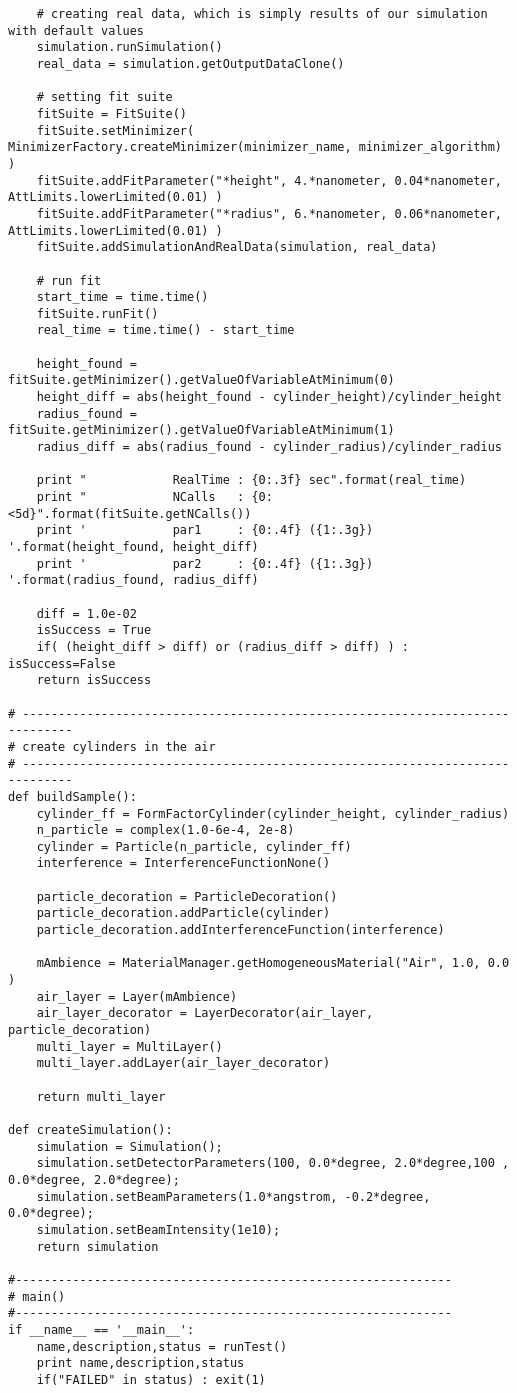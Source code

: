 \begin{lstlisting}
    # creating real data, which is simply results of our simulation with default values
    simulation.runSimulation()
    real_data = simulation.getOutputDataClone()

    # setting fit suite
    fitSuite = FitSuite()
    fitSuite.setMinimizer( MinimizerFactory.createMinimizer(minimizer_name, minimizer_algorithm) )
    fitSuite.addFitParameter("*height", 4.*nanometer, 0.04*nanometer, AttLimits.lowerLimited(0.01) )
    fitSuite.addFitParameter("*radius", 6.*nanometer, 0.06*nanometer, AttLimits.lowerLimited(0.01) )
    fitSuite.addSimulationAndRealData(simulation, real_data)

    # run fit
    start_time = time.time()
    fitSuite.runFit()
    real_time = time.time() - start_time

    height_found = fitSuite.getMinimizer().getValueOfVariableAtMinimum(0)
    height_diff = abs(height_found - cylinder_height)/cylinder_height
    radius_found = fitSuite.getMinimizer().getValueOfVariableAtMinimum(1)
    radius_diff = abs(radius_found - cylinder_radius)/cylinder_radius

    print "            RealTime : {0:.3f} sec".format(real_time)
    print "            NCalls   : {0:<5d}".format(fitSuite.getNCalls())
    print '            par1     : {0:.4f} ({1:.3g}) '.format(height_found, height_diff)
    print '            par2     : {0:.4f} ({1:.3g}) '.format(radius_found, radius_diff)

    diff = 1.0e-02
    isSuccess = True
    if( (height_diff > diff) or (radius_diff > diff) ) : isSuccess=False
    return isSuccess

# -----------------------------------------------------------------------------
# create cylinders in the air
# -----------------------------------------------------------------------------
def buildSample():
    cylinder_ff = FormFactorCylinder(cylinder_height, cylinder_radius)
    n_particle = complex(1.0-6e-4, 2e-8)
    cylinder = Particle(n_particle, cylinder_ff)
    interference = InterferenceFunctionNone()

    particle_decoration = ParticleDecoration()
    particle_decoration.addParticle(cylinder)
    particle_decoration.addInterferenceFunction(interference)

    mAmbience = MaterialManager.getHomogeneousMaterial("Air", 1.0, 0.0 )
    air_layer = Layer(mAmbience)
    air_layer_decorator = LayerDecorator(air_layer, particle_decoration)
    multi_layer = MultiLayer()
    multi_layer.addLayer(air_layer_decorator)

    return multi_layer

def createSimulation():
    simulation = Simulation();
    simulation.setDetectorParameters(100, 0.0*degree, 2.0*degree,100 , 0.0*degree, 2.0*degree);
    simulation.setBeamParameters(1.0*angstrom, -0.2*degree, 0.0*degree);
    simulation.setBeamIntensity(1e10);
    return simulation

#-------------------------------------------------------------
# main()
#-------------------------------------------------------------
if __name__ == '__main__':
    name,description,status = runTest()
    print name,description,status
    if("FAILED" in status) : exit(1)
\end{lstlisting}


